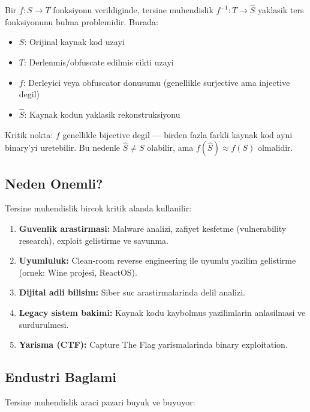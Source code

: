 \documentclass[12pt,a4paper,oneside]{book}
\theoremstyle{definition}
\begin{document}
\begin{tanim}
Bir $f: S \to T$ fonksiyonu verildigi\-nde, tersine muhendislik $f^{-1}: T \to \hat{S}$ yaklasik ters fonksiyonunu bulma problemidir. Burada:
\begin{itemize}
\item $S$: Orijinal kaynak kod uzayi
\item $T$: Derlenmis/obfuscate edilmis cikti uzayi
\item $f$: Derleyici veya obfuscator donusumu (genellikle surjective ama injective degil)
\item $\hat{S}$: Kaynak kodun yaklasik rekonstruksiyonu
\end{itemize}
Kritik nokta: $f$ genellikle bijective degil --- birden fazla farkli kaynak kod ayni binary'yi uretebilir. Bu nedenle $\hat{S} \neq S$ olabilir, ama $f(\hat{S}) \approx f(S)$ olma\-lidir.
\end{tanim}

\subsection{Neden Onemli?}

Tersine muhendislik bircok kritik alanda kullanilir:

\begin{enumerate}
\item \textbf{Guvenlik arastirmasi:} Malware analizi, zafiyet kesfetme (vulnerability research), exploit gelistirme ve savunma.
\item \textbf{Uyumluluk:} Clean-room reverse engineering ile uyumlu yazilim gelistirme (ornek: Wine projesi, ReactOS).
\item \textbf{Dijital adli bilisim:} Siber suc arastirmalarinda delil analizi.
\item \textbf{Legacy sistem bakimi:} Kaynak kodu kaybolmus yazilimlarin anlasil\-masi ve surdurul\-mesi.
\item \textbf{Yarisma (CTF):} Capture The Flag yarismalarinda binary exploitation.
\end{enumerate}

\subsection{Endustri Baglami}

Tersine muhendislik araci pazari buyuk ve buyuyor:
\end{document}
